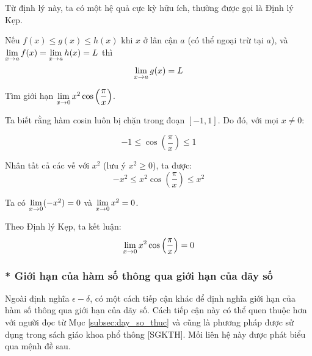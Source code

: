 Từ định lý này, ta có một hệ quả cực kỳ hữu ích, thường được gọi là Định lý Kẹp.

\begin{corollary}
    \label{cor:squeeze-theorem}
    Nếu $f(x) \le g(x) \le h(x)$ khi $x$ ở lân cận $a$ (có thể ngoại trừ tại $a$), và 
    \(\lim\limits_{x \to a} f(x) = \lim\limits_{x \to a} h(x) = L\)
    thì 
    \[\lim\limits_{x \to a} g(x) = L\]
\end{corollary}

\begin{example}
    Tìm giới hạn $\lim\limits_{x \to 0} x^2 \cos\left(\dfrac{\pi}{x}\right)$.
    
    Ta biết rằng hàm cosin luôn bị chặn trong đoạn $[-1, 1]$. Do đó, với mọi $x \neq 0$:
    
    \begin{equation*}
        -1 \le \cos\left(\dfrac{\pi}{x}\right) \le 1
    \end{equation*}
    
    Nhân tất cả các vế với $x^2$ (lưu ý $x^2 \ge 0$), ta được:
    \begin{equation*}
        -x^2 \le x^2 \cos\left(\dfrac{\pi}{x}\right) \le x^2
    \end{equation*}
    
    Ta có $\lim\limits_{x \to 0} (-x^2) = 0$ và $\lim\limits_{x \to 0} x^2 = 0$.
    
    Theo Định lý Kẹp, ta kết luận:
    \begin{equation*}
        \lim\limits_{x \to 0} x^2 \cos\left(\dfrac{\pi}{x}\right) = 0
    \end{equation*}
\end{example}

\subsubsection{* Giới hạn của hàm số thông qua giới hạn của dãy số}
\label{subsec:gioi-han-qua-day-so}

Ngoài định nghĩa $\epsilon-\delta$, có một cách tiếp cận khác để định nghĩa giới hạn của hàm số thông qua giới hạn của dãy số. Cách tiếp cận này có thể quen thuộc hơn với người đọc từ Mục \ref{subsec:day_so_thuc} và cũng là phương pháp được sử dụng trong sách giáo khoa phổ thông [SGKTH]. Mối liên hệ này được phát biểu qua mệnh đề sau.

